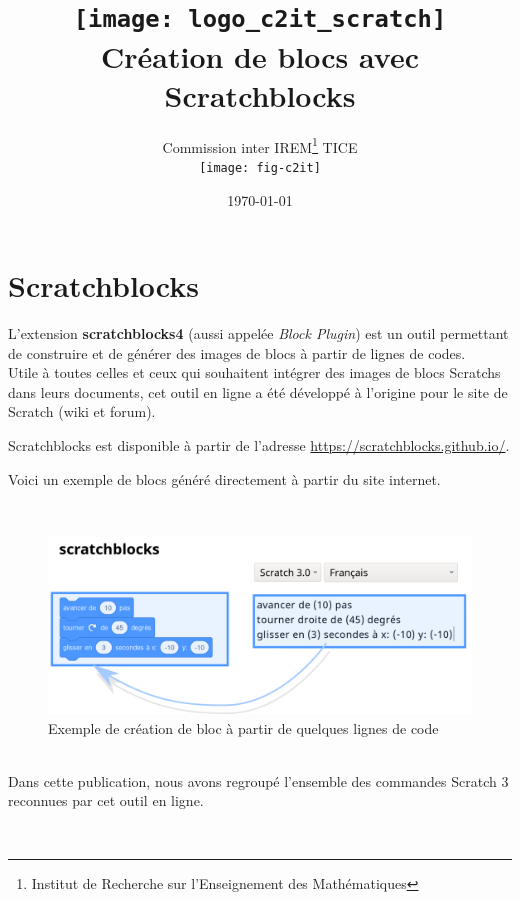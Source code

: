 \documentclass[french,10pt]{article}
\title{%
    \Huge
    \texttt{[image: logo\_c2it\_scratch]}\\[2cm]
    Création de blocs avec Scratchblocks}
\author{%
    Commission inter IREM\footnote{Institut de Recherche sur l'Enseignement des Mathématiques} TICE\\
    \texttt{[image: fig-c2it]}
    }
\date{\today}
\begin{document}
\maketitle
\thispagestyle{empty}

\newpage
\tableofcontents


\newpage

\section{Scratchblocks}


L’extension \textbf{scratchblocks4} (aussi appelée \textit{Block Plugin}) est un outil permettant de construire et de générer des images de blocs à partir de lignes de codes.
\\ 
Utile à toutes celles et ceux qui souhaitent intégrer des images de blocs Scratchs dans leurs documents, cet outil en ligne a été développé à l’origine pour le site de Scratch (wiki et forum).


Scratchblocks est disponible à partir de l'adresse \url{https://scratchblocks.github.io/}.

Voici un exemple de blocs généré directement à partir du site internet.

~\\

\begin{figure}[h]
    \centering
    \includegraphics[width = 15cm]{res/app.png}
    \caption{Exemple de création de bloc à partir de quelques lignes de code}
    \label{}
\end{figure}

~\\

Dans cette publication, nous avons regroupé l'ensemble des commandes Scratch 3 reconnues par cet outil en ligne.

~\\
\end{document}
